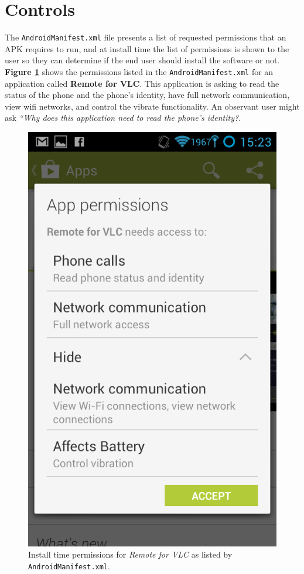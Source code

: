 \documentclass[a4paper]{article}
\begin{document}
\section{Controls}
The \texttt{AndroidManifest.xml} file presents a list of requested permissions
that an APK requires to run, and at install time the list of permissions is
shown to the user so they can determine if the end user should install the
software or not. \textbf{Figure \ref{fig:install-time}} shows the permissions
listed in the \texttt{AndroidManifest.xml} for an application called \textbf{Remote for VLC}.
This application is asking to read the status of the phone and the phone's
identity, have full network communication, view wifi networks, and control the
vibrate functionality. An observant user might ask \emph{``Why does this
application need to read the phone's identity?}.
\\
\begin{figure}[htb]
\centering
\includegraphics[scale=0.4, bb=0 0 480
800]{img/vlc_permissions_install.png}
\caption{Install time permissions for \emph{Remote for VLC} as listed by
\texttt{AndroidManifest.xml}.}
\label{fig:install-time}
\end{figure}
\end{document}
